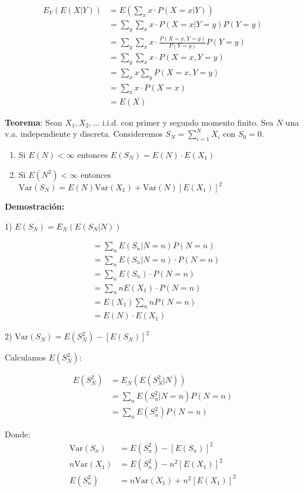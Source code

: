 \documentclass[12pt,a4paper]{article}
\newcommand{\teorema}[1]{%
\begin{teoremabox}
\textbf{Teorema}: #1
\end{teoremabox}
}
\begin{document}
\begin{align*}
E_Y(E(X|Y)) &= E\left(\sum_x x \cdot P(X=x|Y)\right) \\
&= \sum_y \sum_x x \cdot P(X=x|Y=y) P(Y=y) \\
&= \sum_y \sum_x x \cdot \frac{P(X=x, Y=y)}{P(Y=y)} P(Y=y) \\
&= \sum_y \sum_x x \cdot P(X=x, Y=y) \\
&= \sum_x x \sum_y P(X=x, Y=y) \\
&= \sum_x x \cdot P(X=x) \\
&= E(X)
\end{align*}

\teorema{Sean $X_1, X_2, \ldots$ i.i.d. con primer y segundo momento finito. Sea $N$ una v.a. independiente y discreta. Consideremos $S_N = \sum_{i=1}^{N} X_i$ con $S_0 = 0$.
\begin{enumerate}
\item Si $E(N) < \infty$ entonces $E(S_N) = E(N) \cdot E(X_1)$
\item Si $E(N^2) < \infty$ entonces $\text{Var}(S_N) = E(N) \text{Var}(X_1) + \text{Var}(N) [E(X_1)]^2$
\end{enumerate}}

\textbf{Demostración:}

1) $E(S_N) = E_N(E(S_N|N))$

\begin{align*}
&= \sum_n E(S_n|N=n) P(N=n) \\
&= \sum_n E(S_n|N=n) \cdot P(N=n) \\
&= \sum_n E(S_n) \cdot P(N=n) \\
&= \sum_n n E(X_1) \cdot P(N=n) \\
&= E(X_1) \sum_n n P(N=n) \\
&= E(N) \cdot E(X_1)
\end{align*}

2) $\text{Var}(S_N) = E(S_N^2) - [E(S_N)]^2$

Calculamos $E(S_N^2)$:

\begin{align*}
E(S_N^2) &= E_N(E(S_N^2|N)) \\
&= \sum_n E(S_n^2|N=n) P(N=n) \\
&= \sum_n E(S_n^2) P(N=n)
\end{align*}

Donde:
\begin{align*}
\text{Var}(S_n) &= E(S_n^2) - [E(S_n)]^2 \\
n\text{Var}(X_1) &= E(S_n^2) - n^2[E(X_1)]^2 \\
E(S_n^2) &= n\text{Var}(X_1) + n^2[E(X_1)]^2
\end{align*}
\end{document}
